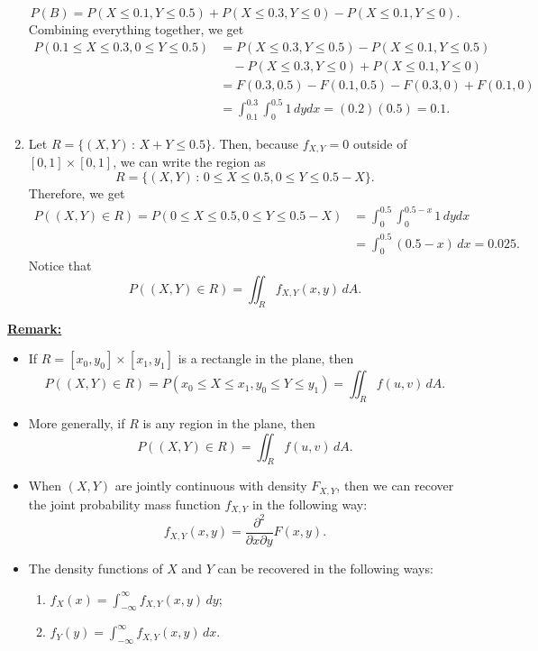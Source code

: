 \begin{sol*}
\begin{enumerate}[label=\alph*)]
    \[
        P (B) = P (X \leq 0.1 , Y \leq 0.5) + P (X \leq 0.3 , Y \leq 0 ) - P (X \leq 0.1, Y \leq 0) .
    \]
Combining everything together, we get
    \begin{align*}
        P (0.1 \leq X \leq 0.3 , 0 \leq Y \leq 0.5 ) &= P (X \leq 0.3, Y \leq 0.5) - P (X \leq 0.1 , Y \leq 0.5) \\
        & \quad - P (X \leq 0.3 , Y \leq 0 ) + P (X \leq 0.1, Y \leq 0) \\ 
        & = F (0.3, 0.5) - F (0.1, 0.5) - F(0.3, 0) + F (0.1, 0) \\ 
        &= \int_{0.1}^{0.3} \int_{0}^{0.5} 1 \, dy dx = (0.2)(0.5) = 0.1 .
    \end{align*}
    \item Let $R = \{ (X, Y) \, : \, X + Y \leq 0.5 \}$. Then, because $f_{X, Y} = 0$ outside of $[0, 1] \times [0, 1]$, we can write the region as
        \[
            R = \{ (X, Y) \, : \, 0 \leq X \leq 0.5 , 0 \leq Y \leq 0.5 - X \} .
        \]
    Therefore, we get
        \begin{align*}
            P ( (X, Y) \in R ) = P (0 \leq X \leq 0.5, 0 \leq Y \leq 0.5 - X ) &= \int_0^{0.5} \int_0^{0.5 - x} 1 \, dy dx \\
            &= \int_0^{0.5} (0.5 - x) \, dx = 0.025 .
        \end{align*}
    Notice that 
        \[
            P ( (X, Y) \in R ) = \iint_R f_{X, Y} (x, y) \, dA . \tag*{$\triangle$}
        \]
    
\end{enumerate}
\end{sol*}

\underline{\textbf{Remark:}} 
\begin{itemize}
    \item If $R = [x_0, y_0] \times [x_1 , y_1]$ is a rectangle in the plane, then
    \[
        P ( (X, Y) \in R ) = P (x_0 \leq X \leq x_1 , y_0 \leq Y \leq y_1) = \iint_R f (u, v) \, dA .
    \]
    \item More generally, if $R$ is any region in the plane, then
    \[
        P ( (X, Y) \in R ) = \iint_R f (u, v) \, dA .
    \]
    \item When $(X, Y)$ are jointly continuous with density $F_{X, Y}$, then we can recover the joint probability mass function $f_{X, Y}$ in the following way:
        \[
            f_{X, Y} (x, y) = \frac{\partial^2}{\partial x \partial y} F (x, y) .
        \]
    \item The density functions of $X$ and $Y$ can be recovered in the following ways:
        \begin{enumerate}[label=\arabic*)]
            \item $f_X (x) = \displaystyle\int_{-\infty}^\infty f_{X, Y} (x, y) \, dy$;
            \item $f_Y (y) = \displaystyle\int_{-\infty}^\infty f_{X, Y} (x, y) \, dx$.
        \end{enumerate}
\end{itemize}

